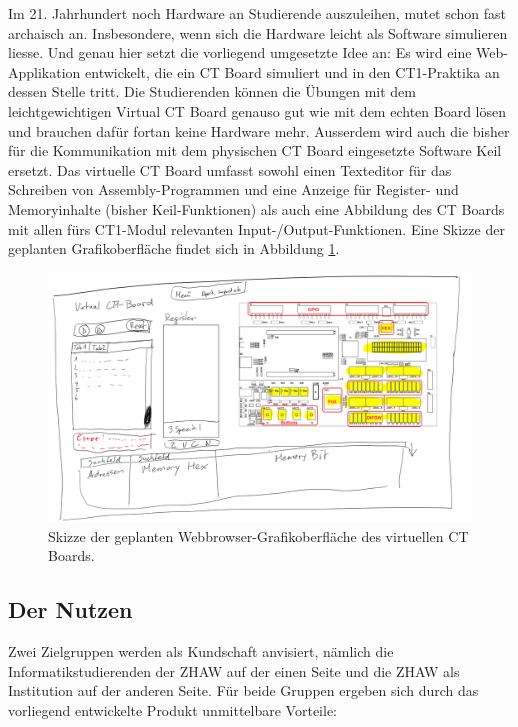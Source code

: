 \documentclass[10pt]{article}
\begin{document}
Im 21. Jahrhundert noch Hardware an Studierende auszuleihen, mutet schon fast archaisch an. Insbesondere, wenn sich die Hardware leicht als Software simulieren liesse. Und genau hier setzt die vorliegend umgesetzte Idee an: Es wird eine Web-Applikation entwickelt, die ein CT Board simuliert und in den CT1-Praktika an dessen Stelle tritt. Die Studierenden können die Übungen mit dem leichtgewichtigen \glqq Virtual CT Board\grqq{} genauso gut wie mit dem echten Board lösen und brauchen dafür fortan keine Hardware mehr. Ausserdem wird auch die bisher für die Kommunikation mit dem physischen CT Board eingesetzte Software Keil ersetzt. Das virtuelle CT Board umfasst sowohl einen Texteditor für das Schreiben von Assembly-Programmen und eine Anzeige für Register- und Memoryinhalte (bisher Keil-Funktionen) als auch eine Abbildung des CT Boards mit allen fürs  CT1-Modul relevanten Input-/Output-Funktionen. Eine Skizze der geplanten Grafikoberfläche findet sich in Abbildung \ref{draft}.

\begin{figure}[h]
\includegraphics[width=\textwidth]{draft}
\caption[size=8pt]{Skizze der geplanten Webbrowser-Grafikoberfläche des virtuellen CT Boards.}
\label{draft}
\end{figure}

\subsection{Der Nutzen}

Zwei Zielgruppen werden als Kundschaft anvisiert, nämlich die Informatikstudierenden der ZHAW auf der einen Seite und die ZHAW als Institution auf der anderen Seite. Für beide Gruppen ergeben sich durch das vorliegend entwickelte Produkt unmittelbare Vorteile:
\end{document}
